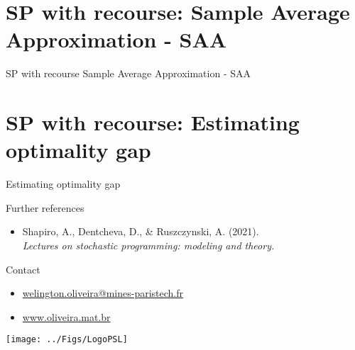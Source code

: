\documentclass[slidstop,compress,8pt]{beamer}
\newcommand{\pula}{\vspace{.1in}}
\begin{document}
\section{SP with recourse: Sample Average Approximation - SAA}
\begin{frame}{ }
\begin{block}{\Large SP with recourse}
 Sample Average Approximation - SAA
\end{block}
\end{frame}


\section{SP with recourse: Estimating optimality gap}

\begin{frame}{ }
\begin{block}{\Large Estimating optimality gap}
\end{block}
\end{frame}

%

\begin{frame}{Further references}
  \begin{itemize}
    \item Shapiro, A., Dentcheva, D., \& Ruszczynski, A. (2021).\\
      \emph{Lectures on stochastic programming: modeling and theory.}
  \end{itemize}
\end{frame}


\begin{frame}{ }
\pula

\begin{block}{Contact}
\begin{itemize}
\item [\Letter] \url{ welington.oliveira@mines-paristech.fr}
\item [\Keyboard] \url{www.oliveira.mat.br}
\end{itemize}
\end{block}
\pula


\begin{center}
\texttt{[image: ../Figs/LogoPSL]}
\end{center}
\end{frame}
\end{document}

